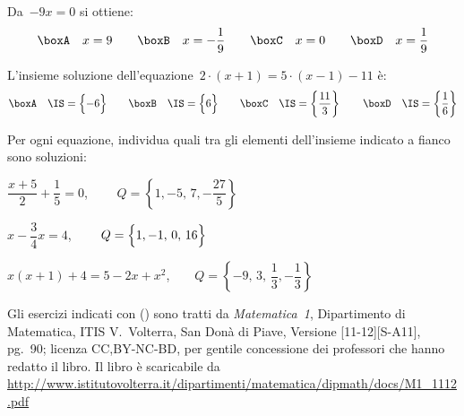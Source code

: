\begin{esercizio}
\label{ese:13.48}
Da~$-9x=0$ si ottiene:
\[\boxA\quad x=9\qquad\boxB\quad x=-{\dfrac{1}{9}}\qquad\boxC\quad 
x=0\qquad\boxD\quad x=\dfrac{1}{9}\]
\end{esercizio}

\begin{esercizio}
\label{ese:13.49}
L'insieme soluzione dell'equazione~$2\cdot \left(x+1\right)=5\cdot 
\left(x-1\right)-11$ è:
\[\boxA\quad \IS=\Bigl\{-6\Bigr\}\qquad\boxB\quad 
\IS=\Bigl\{6\Bigr\}\qquad\boxC\quad 
\IS=\left\{\dfrac{11}{3}\right\}\qquad\boxD\quad 
\IS=\left\{\dfrac{1}{6}\right\}\]
\end{esercizio}

\begin{esercizio}
\label{ese:13.50}
Per ogni equazione, individua quali tra gli elementi dell'insieme indicato a 
fianco sono soluzioni:
\begin{enumeratea}
\spazielenx
 \item $\dfrac{x+5}{2}+\dfrac{1}{5}=0$, $\qquad 
Q=\left\{1,-5,\,7,-\dfrac{27}{5}\right\}$
 \item $x-\dfrac{3}{4}x=4$, $\qquad Q=\Bigl\{1,-1,\,0,\,16\Bigr\}$
 \item $x(x+1)+4=5-2x+x^{2}$,$\qquad 
Q=\left\{-9,\,3,\,\dfrac{1}{3},-\dfrac{1}{3}\right\}$
\end{enumeratea}
\end{esercizio}


Gli esercizi indicati con (\croce) sono tratti da \emph{Matematica~1}, 
Dipartimento di Matematica, ITIS V.~Volterra, San Donà di Piave, Versione 
[11-12][S-A11], pg.~90;
licenza CC,BY-NC-BD, per gentile concessione dei professori che hanno redatto 
il 
libro.
Il libro è scaricabile da 
\url{
http://www.istitutovolterra.it/dipartimenti/matematica/dipmath/docs/M1_1112.pdf}


\subsubsection*{}

